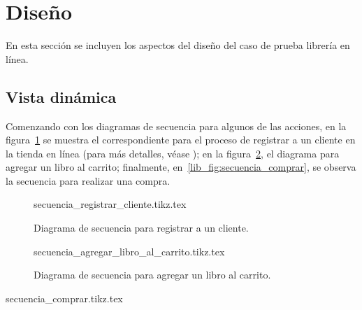 %
%

\section{Diseño}
En esta sección se incluyen los aspectos del diseño del caso de prueba
librería en línea.

\subsection{Vista dinámica}
Comenzando con los diagramas de secuencia para algunos de las acciones, en la
figura~\ref{lib_fig:secuencia_registrar_cliente} se muestra el correspondiente
para el proceso de registrar a un cliente en la tienda en línea (para más
detalles, véase ); en la
figura~\ref{lib_fig:secuencia_agregar_libro_al_carrito}, el diagrama para
agregar un libro al carrito; finalmente, en~\ref{lib_fig:secuencia_comprar},
se observa la secuencia para realizar una compra.

\begin{figure}
  \begin{center}
    {secuencia_registrar_cliente.tikz.tex}
    \caption{Diagrama de secuencia para registrar a un cliente.}
    \label{lib_fig:secuencia_registrar_cliente}
  \end{center}
\end{figure}

\begin{figure}
  \begin{center}
    {secuencia_agregar_libro_al_carrito.tikz.tex}
    \caption{Diagrama de secuencia para agregar un libro al carrito.}
    \label{lib_fig:secuencia_agregar_libro_al_carrito}
  \end{center}
\end{figure}

\begin{sidewaysfigure}
  \begin{center}
    {secuencia_comprar.tikz.tex}
    \caption{Diagrama de secuencia para realizar una compra.}
    \label{lib_fig:secuencia_comprar}
  \end{center}
\end{sidewaysfigure}
